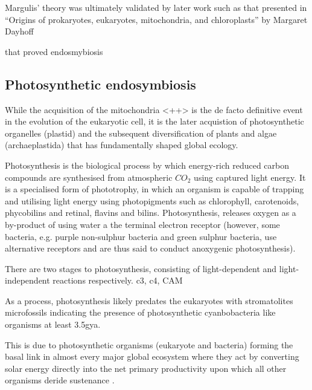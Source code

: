 Margulis' theory was ultimately validated by later work such as that presented in 
``Origins of prokaryotes, eukaryotes, mitochondria, and chloroplasts'' by Margaret Dayhoff 

that proved endosmybiosis \citep{Schwartz1976}










\subsection{Photosynthetic endosymbiosis}

While the acquisition of the mitochondria <++> %
is the de facto definitive event in the evolution of the eukaryotic cell, 
it is the later acquistion of photosynthetic organelles (plastid) and the subsequent 
diversification of plants and algae (archaeplastida) that has fundamentally shaped global ecology.

Photosynthesis is the biological process by which energy-rich reduced carbon compounds 
are synthesised from atmospheric \(CO_{2}\) using captured light energy. 
It is a specialised form of phototrophy, in which an organism is capable of trapping
and utilising light energy using photopigments such as chlorophyll, carotenoids, phycobilins
and retinal, flavins and bilins. 
Photosynthesis, releases oxygen as a by-product of using water a the terminal electron receptor 
(however, some bacteria, e.g. purple non-sulphur bacteria and green sulphur bacteria, use alternative
receptors and are thus said to conduct anoxygenic photosynthesis).

There are two stages to photosynthesis, consisting of light-dependent and light-independent reactions respectively.
c3, c4, CAM


As a process, photosynthesis likely predates the eukaryotes with stromatolites microfossils 
indicating the presence of photosynthetic cyanbobacteria like organisms at least 3.5gya.













This is due to photosynthetic organisms (eukaryote and bacteria) forming the basal 
link in almost every major global ecosystem where they act by converting solar energy 
directly into the net primary productivity upon which all other organisms 
deride sustenance \citep{Reyes-Prieto2007}.



